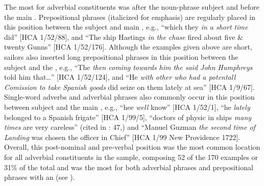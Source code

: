 \begin{figure}
    
\end{figure}


The most  for adverbial constituents was after the noun-phrase subject and before the main . Prepositional phrases (italicized for emphasis) are regularly placed in this position between the subject and main , e.g., “which they \textit{in a short time} did” [HCA 1/52/88], and “The ship Hastings \textit{in the chase} fired about five \& twenty Gunns” [HCA 1/52/176]. Although the examples given above are short, sailors also inserted long prepositional phrases in this position between the subject and the , e.g., “The  \textit{then coming towards him the said John Humphreys} told him that…” [HCA 1/52/124], and “He \textit{with other who had a potentall Comission to take Spanish goods} did seize on them lately at sea” [HCA 1/9/67]. Single-word adverbs and adverbial phrases also commonly occur in this position between subject and the main , e.g., “hee \textit{well} know” [HCA 1/52/1], “he \textit{lately} belonged to a Spanish frigate” [HCA 1/99/5], “doctors of physic in ships \textit{many times} are very careless” (cited in \citealt{Brown2011}: 47,) and “Manuel Guzman \textit{the second time of Landing} was chosen the officer in Chief” [HCA 1/99 New Providence 1722]. Overall, this post-nominal and pre-verbal position was the most common location for all adverbial constituents in the sample, composing 52 of the 170 examples or 31\% of the total and was the most  for both adverbial phrases and prepositional phrases with an  
(see ). 

